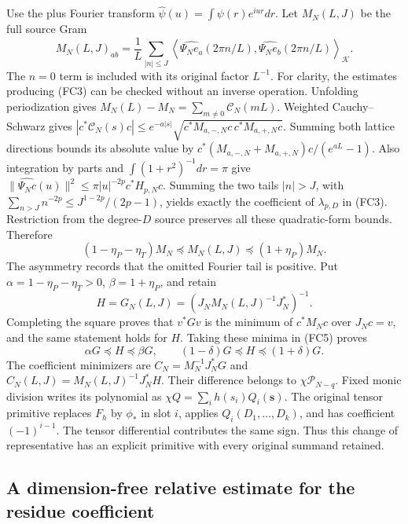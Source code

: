 \documentclass{article}
\begin{document}
Use the plus Fourier transform $\widehat\psi(u)=\int\psi(r)e^{iur}dr$.
Let $M_N(L,J)$ be the full source Gram
\[
 M_N(L,J)_{ab}=\frac1L\sum_{|n|\le J}
 \left\langle\widehat{\Psi_N e_a}(2\pi n/L),
                  \widehat{\Psi_N e_b}(2\pi n/L)\right\rangle_{\mathcal K}.
 \tag{FC4}
\]
The $n=0$ term is included with its original factor $L^{-1}$.
For clarity, the estimates producing (FC3) can be checked without an
inverse operation. Unfolding periodization gives
$M_N(L)-M_N=\sum_{m\ne0}\mathcal C_N(mL)$. Weighted Cauchy--Schwarz gives
$|c^*\mathcal C_N(s)c|\le e^{-a|s|}
\sqrt{c^*M_{a,-,N}c\,c^*M_{a,+,N}c}$.
Summing both lattice directions bounds its absolute value by
$c^*(M_{a,-,N}+M_{a,+,N})c/(e^{aL}-1)$.
Also integration by parts and $\int(1+r^2)^{-1}dr=\pi$ give
$\|\widehat{\Psi_Nc}(u)\|^2\le\pi|u|^{-2p}c^*H_{p,N}c$.
Summing the two tails $|n|>J$, with
$\sum_{n>J}n^{-2p}\le J^{1-2p}/(2p-1)$, yields exactly
the coefficient of $\lambda_{p,D}$ in (FC3). Restriction from the
degree-$D$ source preserves all these quadratic-form bounds. Therefore
\[
 (1-\eta_P-\eta_T)M_N\preceq M_N(L,J)
       \preceq(1+\eta_P)M_N.
 \tag{FC5}
\]
The asymmetry records that the omitted Fourier tail is positive.
Put $\alpha=1-\eta_P-\eta_T>0$, $\beta=1+\eta_P$, and retain
\[
 H=G_N(L,J)=(J_NM_N(L,J)^{-1}J_N^*)^{-1}.
 \tag{FC6}
\]
Completing the square proves that $v^*Gv$ is the minimum of $c^*M_Nc$
over $J_Nc=v$, and the same statement holds for $H$. Taking these
minima in (FC5) proves
\[
 \alpha G\preceq H\preceq\beta G,
 \qquad (1-\delta)G\preceq H\preceq(1+\delta)G.
 \tag{FC7}
\]
The coefficient minimizers are $C_N=M_N^{-1}J_N^*G$ and
$C_N(L,J)=M_N(L,J)^{-1}J_N^*H$. Their difference belongs to
$\chi\mathcal P_{N-q}$. Fixed monic division writes its polynomial
as $\chi Q=\sum_i h(s_i)Q_i(\mathbf s)$. The original tensor primitive
replaces $F_h$ by $\phi_*$ in slot $i$, applies $Q_i(D_1,\ldots,D_k)$,
and has coefficient $(-1)^{i-1}$. The tensor differential contributes
the same sign. Thus this change of representative has an explicit
primitive with every original summand retained.

\subsection{A dimension-free relative estimate for the residue coefficient}
\end{document}
